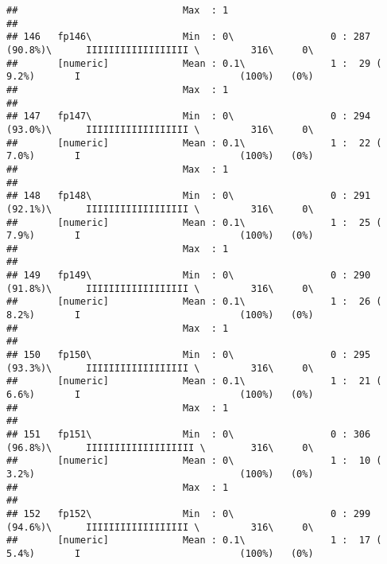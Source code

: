 \documentclass[]{article}
\begin{document}
\begin{verbatim}
##                             Max  : 1                                                                                       
## 
## 146   fp146\                Min  : 0\                 0 : 287 (90.8%)\      IIIIIIIIIIIIIIIIII \         316\     0\       
##       [numeric]             Mean : 0.1\               1 :  29 ( 9.2%)       I                            (100%)   (0%)     
##                             Max  : 1                                                                                       
## 
## 147   fp147\                Min  : 0\                 0 : 294 (93.0%)\      IIIIIIIIIIIIIIIIII \         316\     0\       
##       [numeric]             Mean : 0.1\               1 :  22 ( 7.0%)       I                            (100%)   (0%)     
##                             Max  : 1                                                                                       
## 
## 148   fp148\                Min  : 0\                 0 : 291 (92.1%)\      IIIIIIIIIIIIIIIIII \         316\     0\       
##       [numeric]             Mean : 0.1\               1 :  25 ( 7.9%)       I                            (100%)   (0%)     
##                             Max  : 1                                                                                       
## 
## 149   fp149\                Min  : 0\                 0 : 290 (91.8%)\      IIIIIIIIIIIIIIIIII \         316\     0\       
##       [numeric]             Mean : 0.1\               1 :  26 ( 8.2%)       I                            (100%)   (0%)     
##                             Max  : 1                                                                                       
## 
## 150   fp150\                Min  : 0\                 0 : 295 (93.3%)\      IIIIIIIIIIIIIIIIII \         316\     0\       
##       [numeric]             Mean : 0.1\               1 :  21 ( 6.6%)       I                            (100%)   (0%)     
##                             Max  : 1                                                                                       
## 
## 151   fp151\                Min  : 0\                 0 : 306 (96.8%)\      IIIIIIIIIIIIIIIIIII \        316\     0\       
##       [numeric]             Mean : 0\                 1 :  10 ( 3.2%)                                    (100%)   (0%)     
##                             Max  : 1                                                                                       
## 
## 152   fp152\                Min  : 0\                 0 : 299 (94.6%)\      IIIIIIIIIIIIIIIIII \         316\     0\       
##       [numeric]             Mean : 0.1\               1 :  17 ( 5.4%)       I                            (100%)   (0%)     

\end{verbatim}
\end{document}
